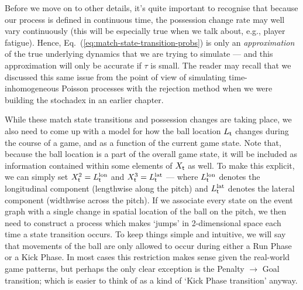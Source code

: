 Before we move on to other details, it's quite important to recognise that because our process is defined in continuous time, the possession change rate may well vary continuously (this will be especially true when we talk about, e.g., player fatigue). Hence, Eq.~(\ref{eq:match-state-transition-probs}) is only an \emph{approximation} of the true underlying dynamics that we are trying to simulate --- and this approximation will only be accurate if $\tau$ is small. The reader may recall that we discussed this same issue from the point of view of simulating time-inhomogeneous Poisson processes with the rejection method when we were building the stochadex in an earlier chapter. 

While these match state transitions and possession changes are taking place, we also need to come up with a model for how the ball location $L_{{\sf t}}$ changes during the course of a game, and as a function of the current game state. Note that, because the ball location is a part of the overall game state, it will be included as information contained within some elements of $X_{{\sf t}}$ as well. To make this explicit, we can simply set $X^2_{{\sf t}}=L^{\rm lon}_{{\sf t}}$ and $X^3_{{\sf t}}=L^{\rm lat}_{{\sf t}}$ --- where $L^{\rm lon}_{{\sf t}}$ denotes the longitudinal component (lengthwise along the pitch) and $L^{\rm lat}_{{\sf t}}$ denotes the lateral component (widthwise across the pitch). If we associate every state on the event graph with a single change in spatial location of the ball on the pitch, we then need to construct a process which makes `jumps' in 2-dimensional space each time a state transition occurs. To keep things simple and intuitive, we will say that movements of the ball are only allowed to occur during either a {\sf Run Phase} or a {\sf Kick Phase}. In most cases this restriction makes sense given the real-world game patterns, but perhaps the only clear exception is the {\sf Penalty} $\longrightarrow$ {\sf Goal} transition; which is easier to think of as a kind of `{\sf Kick Phase} transition' anyway. 

